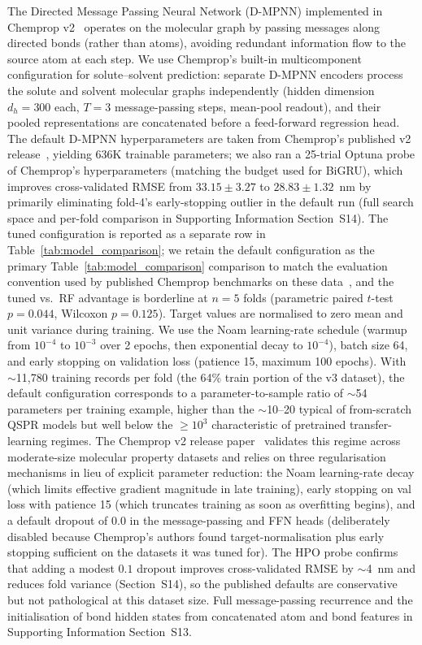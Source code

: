 \documentclass[journal=jcisd8,manuscript=article]{achemso}
\newcommand{\added}[1]{{\color{addedblue}#1}}
\begin{document}
\added{The Directed Message Passing Neural Network (D-MPNN) implemented in Chemprop v2~\cite{yangAnalyzingLearnedMolecular2019,chempropv2_2024} operates on the molecular graph by passing messages along directed bonds (rather than atoms), avoiding redundant information flow to the source atom at each step. We use Chemprop's built-in multicomponent configuration for solute--solvent prediction: separate D-MPNN encoders process the solute and solvent molecular graphs independently (hidden dimension $d_h = 300$ each, $T = 3$ message-passing steps, mean-pool readout), and their pooled representations are concatenated before a feed-forward regression head. The default D-MPNN hyperparameters are taken from Chemprop's published v2 release~\cite{yangAnalyzingLearnedMolecular2019,chempropv2_2024}, yielding 636K trainable parameters; we also ran a 25-trial Optuna probe of Chemprop's hyperparameters (matching the budget used for BiGRU), which improves cross-validated RMSE from $33.15 \pm 3.27$ to $28.83 \pm 1.32$~nm by primarily eliminating fold-4's early-stopping outlier in the default run (full search space and per-fold comparison in Supporting Information Section~S14). The tuned configuration is reported as a separate row in Table~\ref{tab:model_comparison}; we retain the default configuration as the primary Table~\ref{tab:model_comparison} comparison to match the evaluation convention used by published Chemprop benchmarks on these data~\cite{joung2021deep,beard2019comparative,greenman2022multifidelity,jung2024machine,chempropv2_2024}, and the tuned vs.\ RF advantage is borderline at $n = 5$ folds (parametric paired $t$-test $p = 0.044$, Wilcoxon $p = 0.125$). Target values are normalised to zero mean and unit variance during training. We use the Noam learning-rate schedule (warmup from $10^{-4}$ to $10^{-3}$ over 2 epochs, then exponential decay to $10^{-4}$), batch size 64, and early stopping on validation loss (patience 15, maximum 100 epochs). With $\sim$11{,}780 training records per fold (the 64\% train portion of the v3 dataset), the default configuration corresponds to a parameter-to-sample ratio of $\sim$54 parameters per training example, higher than the $\sim$10--20 typical of from-scratch QSPR models but well below the $\geq 10^3$ characteristic of pretrained transfer-learning regimes. The Chemprop v2 release paper~\cite{chempropv2_2024} validates this regime across moderate-size molecular property datasets and relies on three regularisation mechanisms in lieu of explicit parameter reduction: the Noam learning-rate decay (which limits effective gradient magnitude in late training), early stopping on val loss with patience 15 (which truncates training as soon as overfitting begins), and a default dropout of $0.0$ in the message-passing and FFN heads (deliberately disabled because Chemprop's authors found target-normalisation plus early stopping sufficient on the datasets it was tuned for). The HPO probe confirms that adding a modest $0.1$ dropout improves cross-validated RMSE by $\sim$4~nm and reduces fold variance (Section~S14), so the published defaults are conservative but not pathological at this dataset size. Full message-passing recurrence and the initialisation of bond hidden states from concatenated atom and bond features in Supporting Information Section~S13.}
\end{document}
